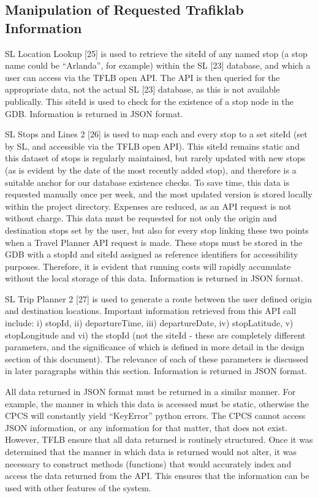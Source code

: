 \documentclass[12pt]{article}   	%
\begin{document}
\newpage

\subsection{Manipulation of Requested Trafiklab Information}
SL Location Lookup [25] is used to retrieve the siteId of any named stop (a stop name could be “Arlanda”, for example) within the SL [23] database, and which a user can access via the TFLB open API. The API is then queried for the appropriate data, not the actual SL [23] database, as this is not available publically. This siteId is used to check for the existence of a stop node in the GDB. Information is returned in JSON format.

SL Stops and Lines 2 [26] is used to map each and every stop to a set siteId (set by SL, and accessible via the TFLB open API). This siteId remains static and this dataset of stops is regularly maintained, but rarely updated with new stops (as is evident by the date of the most recently added stop), and therefore is a suitable anchor for our database existence checks. To save time, this data is requested manually once per week, and the most updated version is stored locally within the project directory. Expenses are reduced, as an API request is not without charge. This data must be requested for not only the origin and destination stops set by the user, but also for every stop linking these two points when a Travel Planner API request is made. These stops must be stored in the GDB with a stopId and siteId assigned as reference identifiers for accessibility purposes. Therefore, it is evident that running costs will rapidly accumulate without the local storage of this data. Information is returned in JSON format.

SL Trip Planner 2 [27] is used to generate a route between the user defined origin and destination locations. Important information retrieved from this API call include: i) stopId, ii) departureTime, iii) departureDate, iv) stopLatitude, v) stopLongitude and vi) the stopId (not the siteId - these are completely different parameters, and the significance of which is defined in more detail in the design section of this document). The relevance of each of these parameters is discussed in later paragraphs within this section. Information is returned in JSON format.

All data returned in JSON format must be returned in a similar manner. For example, the manner in which this data is accessed must be static, otherwise the CPCS will constantly yield “KeyError” python errors. The CPCS cannot access JSON information, or any information for that matter, that does not exist. However, TFLB ensure that all data returned is routinely structured. Once it was determined that the manner in which data is returned would not alter, it was necessary to construct methods (functions) that would accurately index and access the data returned from the API. This ensures that the information can be used with other features of the system.
\end{document}

